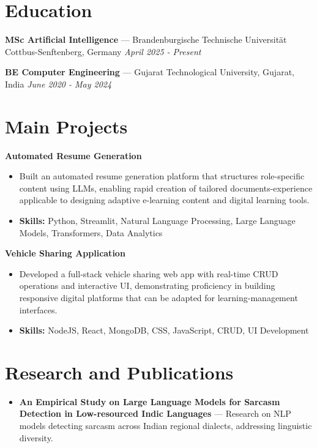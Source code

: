 \documentclass[a4paper,10pt]{article}
\begin{document}
\section*{Education}
\textbf{MSc Artificial Intelligence} — Brandenburgische Technische Universität Cottbus-Senftenberg, Germany \hfill \textit{April 2025 - Present}\par
\vspace{1.5pt}
\textbf{BE Computer Engineering} — Gujarat Technological University, Gujarat, India \hfill \textit{June 2020 - May 2024}\par

\section*{Main Projects}
\textbf{Automated Resume Generation}\par
\vspace{1pt}
\begin{itemize}
  \item Built an automated resume generation platform that structures role-specific content using LLMs, enabling rapid creation of tailored documents-experience applicable to designing adaptive e-learning content and digital learning tools.
  \item \textbf{Skills:} Python, Streamlit, Natural Language Processing, Large Language Models, Transformers, Data Analytics
\end{itemize}
\vspace{3pt}
\textbf{Vehicle Sharing Application}\par
\vspace{1pt}
\begin{itemize}
  \item Developed a full-stack vehicle sharing web app with real-time CRUD operations and interactive UI, demonstrating proficiency in building responsive digital platforms that can be adapted for learning-management interfaces.
  \item \textbf{Skills:} NodeJS, React, MongoDB, CSS, JavaScript, CRUD, UI Development
\end{itemize}

\section*{Research and Publications}
\begin{itemize}
\item \textbf{An Empirical Study on Large Language Models for Sarcasm Detection in Low-resourced Indic Languages} — Research on NLP models detecting sarcasm across Indian regional dialects, addressing linguistic diversity.
\end{itemize}
\end{document}
